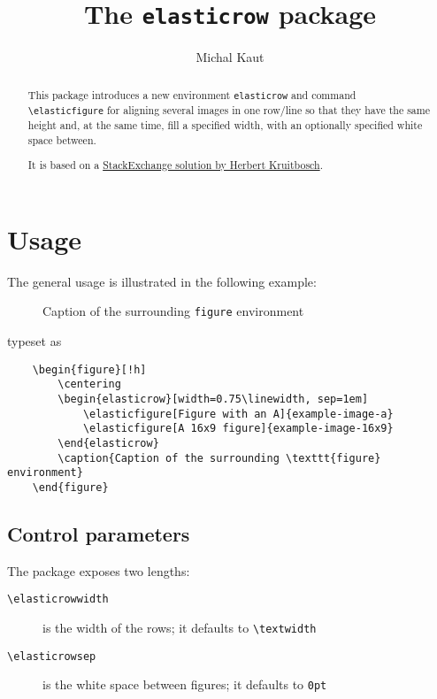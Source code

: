 \documentclass[a4paper]{scrartcl}
\title{The \texttt{elasticrow} package}
\author{Michal Kaut}
\begin{document}
\maketitle

\begin{abstract}
	This package introduces a new environment \verb|elasticrow| and command \verb|\elasticfigure| for aligning several images in one row/line so that they have the same height and, at the same time, fill a specified width, with an optionally specified white space between.
	
	It is based on a \href{https://tex.stackexchange.com/q/227935}{StackExchange solution by Herbert Kruitbosch}.
\end{abstract}

\section{Usage}

The general usage is illustrated in the following example:

\begin{figure}[!h]
	\centering
	\begin{elasticrow}[width=0.75\linewidth, sep=1em]
	\end{elasticrow}
	\caption{Caption of the surrounding \texttt{figure} environment}
\end{figure}

\noindent
typeset as
\begin{verbatim}
	\begin{figure}[!h]
	    \centering
	    \begin{elasticrow}[width=0.75\linewidth, sep=1em]
	        \elasticfigure[Figure with an A]{example-image-a}
	        \elasticfigure[A 16x9 figure]{example-image-16x9}
	    \end{elasticrow}
	    \caption{Caption of the surrounding \texttt{figure} environment}
	\end{figure}
\end{verbatim}


\subsection{Control parameters}

The package exposes two lengths:
\begin{description}
	\item[\texttt{\textbackslash{}elasticrowwidth}] is the width of the rows; it defaults to \verb*|\textwidth|
	\item[\texttt{\textbackslash{}elasticrowsep}] is the white space between figures; it defaults to \verb*|0pt|
\end{description}
\end{document}
